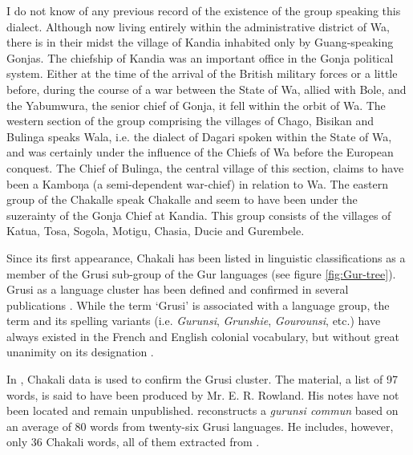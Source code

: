 \begin{Lquote} I do not know of any previous record 	of the existence of the
group speaking
this dialect. Although now living entirely within the administrative district of
Wa, there is in their midst the village of Kandia inhabited only by
Guang-speaking Gonjas. The chiefship of Kandia was an important office in the
Gonja political system. Either at the time of the arrival of the British
military forces or a little before, during the course of a war between the State
of Wa, allied with Bole, and the Yabumwura, the senior chief of Gonja, it fell
within the orbit of Wa. The western section of the group comprising the villages
of Chago, Bisikan and Bulinga speaks Wala, i.e. the dialect of Dagari spoken
within the State of Wa, and was certainly under the influence of the Chiefs of
Wa before the European conquest. The Chief of Bulinga, the central village of
this section, claims to have been a Kamboŋa (a semi-dependent war-chief) in
relation to Wa. The eastern group of the Chakalle speak Chakalle and seem to
have been under the suzerainty of the Gonja Chief at Kandia. This group consists
of the villages of Katua, Tosa, Sogola, Motigu, Chasia, Ducie and
Gurembele.\\
 \end{Lquote}




Since its first appearance,   Chakali has been
listed in   linguistic classifications  as a member of the
Grusi sub-group of the Gur languages (see figure \ref{fig:Gur-tree}).  Grusi  as
a language cluster has
been defined and confirmed in several publications \citep{Dela12, Kohl58,
Bend65,
Mane69a, Mane69b, Klei97}.  While the term `Grusi' is associated with a language
group, the term and its spelling variants (i.e. {\it
Gurunsi}, {\it Grunshie}, {\it Gourounsi}, etc.)  have always existed in the
French and English
colonial vocabulary, but without great unanimity on its designation
\citep{Taux21, Taux24, Ratt32a, Ratt32b, Nico52, Dupe84}.




 In \cite{Bend65},  Chakali data is used to confirm the Grusi cluster. The
material, a list of 97 words, is said to have been produced by Mr. E. R.
Rowland. His notes have not been located and remain unpublished.  
\cite{Mane69a, Mane69b} reconstructs  a {\it  gurunsi commun}  based on an
average of 80 words from twenty-six Grusi languages.  He includes, however, only
36 Chakali words, all of them extracted from \cite{Bend65}.


